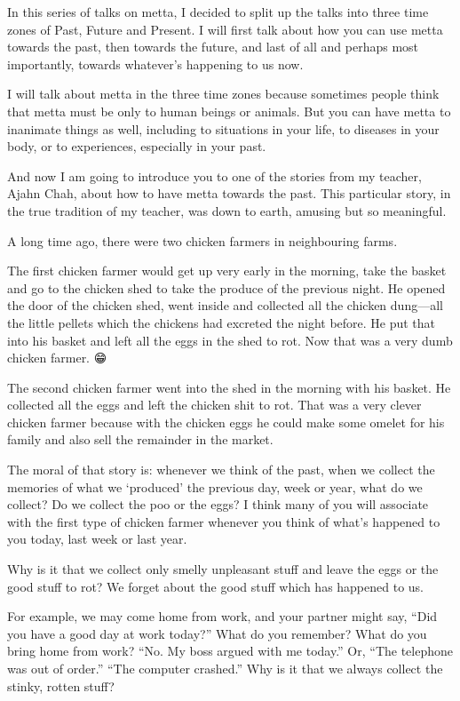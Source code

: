 \documentclass[12pt, openany]{book}
\begin{document}
In this series of talks on metta, I decided to split up the talks into three time zones of Past, Future and Present. I will first talk about how you can use metta towards the past, then towards the future, and last of all and perhaps most importantly, towards whatever’s happening to us now. 

I will talk about metta in the three time zones because sometimes people think that metta must be only to human beings or animals. But you can have metta to inanimate things as well, including to situations in your life, to diseases in your body, or to experiences, especially in your past. 

And now I am going to introduce you to one of the stories from my teacher, Ajahn Chah, about how to have metta towards the past. This particular story, in the true tradition of my teacher, was down to earth, amusing but so meaningful. 

A long time ago, there were two chicken farmers in neighbouring farms. 

The first chicken farmer would get up very early in the morning, take the basket and go to the chicken shed to take the produce of the previous night. He opened the door of the chicken shed, went inside and collected all the chicken dung—all the little pellets which the chickens had excreted the night before. He put that into his basket and left all the eggs in the shed to rot. Now that was a very dumb chicken farmer. 😁 

The second chicken farmer went into the shed in the morning with his basket. He collected all the eggs and left the chicken shit to rot. That was a very clever chicken farmer because with the chicken eggs he could make some omelet for his family and also sell the remainder in the market. 

The moral of that story is: whenever we think of the past, when we collect the memories of what we ‘produced’ the previous day, week or year, what do we collect? Do we collect the poo or the eggs? I think many of you will associate with the first type of chicken farmer whenever you think of what’s happened to you today, last week or last year. 

Why is it that we collect only smelly unpleasant stuff and leave the eggs or the good stuff to rot? We forget about the good stuff which has happened to us. 

For example, we may come home from work, and your partner might say, “Did you have a good day at work today?” What do you remember? What do you bring home from work? “No. My boss argued with me today.” Or, “The telephone was out of order.” “The computer crashed.” Why is it that we always collect the stinky, rotten stuff? 
\end{document}
